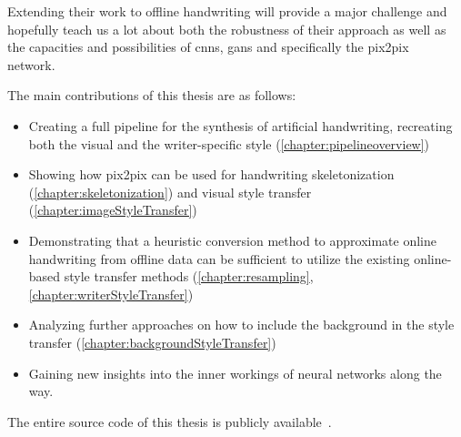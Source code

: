 Extending their work to offline handwriting will provide a major challenge and hopefully teach us a lot about both the robustness of their approach as well as the capacities and possibilities of \glspl{cnn}, \glspl{gan} and specifically the \gls{pix2pix} network.~\cite{pix2pix}

The main contributions of this thesis are as follows:
\begin{itemize}
\item Creating a full pipeline for the synthesis of artificial handwriting, recreating both the visual and the writer-specific style (\cref{chapter:pipelineoverview})
\item Showing how pix2pix can be used for handwriting skeletonization (\cref{chapter:skeletonization}) and visual style transfer (\cref{chapter:imageStyleTransfer})
\item Demonstrating that a heuristic conversion method to approximate online handwriting from offline data can be sufficient to utilize the existing online-based style transfer methods (\cref{chapter:resampling}, \cref{chapter:writerStyleTransfer})
\item Analyzing further approaches on how to include the background in the style transfer (\cref{chapter:backgroundStyleTransfer})
\item Gaining new insights into the inner workings of neural networks along the way.
\end{itemize}
\vspace{0.05\textwidth}

The entire source code of this thesis is publicly available~\cite{thesisSourceCode}.